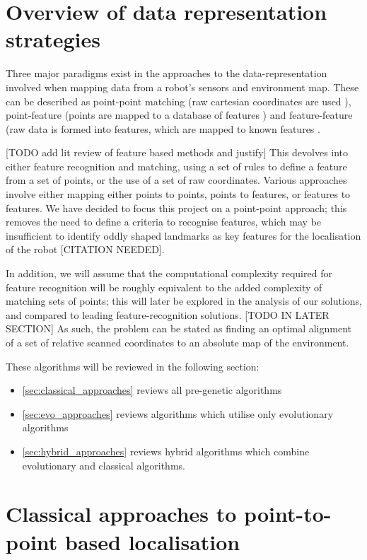 \documentclass[authoryearcitations]{UoYCSproject}
\begin{document}
\section{Overview of data representation strategies}
Three major paradigms exist in the approaches to the data-representation involved when mapping data from a robot's sensors and environment map. These can be described as point-point matching (raw cartesian coordinates are used \cite{Lu1997-zv}), point-feature (points are mapped to a database of features \cite{Censi2008-ik}) and feature-feature (raw data is formed into features, which are mapped to known features \cite{Reina2000-vq}.

[TODO add lit review of feature based methods and justify]
This devolves into either feature recognition and matching, using a set of rules to define a feature from a set of points, or the use of a set of raw coordinates. Various approaches involve either mapping either points to points, points to features, or features to features. We have decided to focus this project on a point-point approach; this removes the need to define a criteria to recognise features, which may be insufficient to identify oddly shaped landmarks as key features for the localisation of the robot [CITATION NEEDED].

In addition, we will assume that the computational complexity required for feature recognition will be roughly equivalent to the added complexity of matching sets of points; this will later be explored in the analysis of our solutions, and compared to leading feature-recognition solutions. [TODO IN LATER SECTION] As such, the problem can be stated as finding an optimal alignment of a set of relative scanned coordinates to an absolute map of the environment.

These algorithms will be reviewed in the following section:
\begin{itemize}
	\item \autoref{sec:classical_approaches} reviews all pre-genetic algorithms
	\item \autoref{sec:evo_approaches} reviews algorithms which utilise only evolutionary algorithms
	\item \autoref{sec:hybrid_approaches} reviews hybrid algorithms which combine evolutionary and classical algorithms.
\end{itemize}


\section{Classical approaches to point-to-point based localisation}
\end{document}
